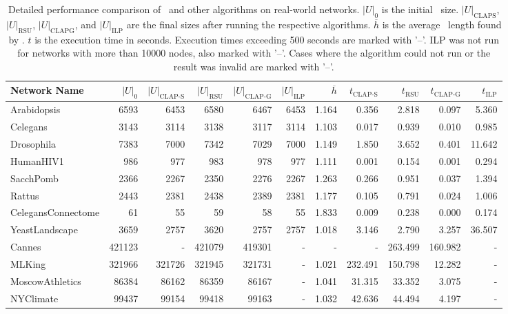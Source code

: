 \begin{table*}[!htbp]
\caption{
    Detailed performance comparison of \algoCLAPS\ and other algorithms on real-world networks. 
    $|U|_0$ is the initial \UDSabbr\ size. 
    $|U|_{\text{CLAPS}}$, $|U|_{\text{RSU}}$, $|U|_{\text{CLAPG}}$, and $|U|_{\text{ILP}}$ are the final sizes after running the respective algorithms. 
    $\overline{h}$ is the average \CLAPabbr\ length found by \algoCLAPS.
    $t$ is the execution time in seconds. 
    Execution times exceeding 500 seconds are marked with '--'. 
    ILP was not run for networks with more than 10000 nodes, also marked with '--'.
    Cases where the algorithm could not run or the result was invalid are marked with '--'.
}
\label{tab:real_networks_comparison}
\centering
\begin{tabular}{lrrrrrrrrrr}
\toprule
Network Name & $|U|_0$ & $|U|_{\text{CLAP-S}}$ & $|U|_{\text{RSU}}$ & $|U|_{\text{CLAP-G}}$ & $|U|_{\text{ILP}}$ & $\overline{h}$ & $t_{\text{CLAP-S}}$ & $t_{\text{RSU}}$ & $t_{\text{CLAP-G}}$ & $t_{\text{ILP}}$ \\
\midrule
Arabidopsis & 6593 & 6453 & 6580 & 6467 & 6453 & 1.164 & 0.356 & 2.818 & 0.097 & 5.360 \\
Celegans & 3143 & 3114 & 3138 & 3117 & 3114 & 1.103 & 0.017 & 0.939 & 0.010 & 0.985 \\
Drosophila & 7383 & 7000 & 7342 & 7029 & 7000 & 1.149 & 1.850 & 3.652 & 0.401 & 11.642 \\
HumanHIV1 & 986 & 977 & 983 & 978 & 977 & 1.111 & 0.001 & 0.154 & 0.001 & 0.294 \\
SacchPomb & 2366 & 2267 & 2350 & 2276 & 2267 & 1.263 & 0.266 & 0.951 & 0.037 & 1.394 \\
Rattus & 2443 & 2381 & 2438 & 2389 & 2381 & 1.177 & 0.105 & 0.791 & 0.024 & 1.006 \\
CelegansConnectome & 61 & 55 & 59 & 58 & 55 & 1.833 & 0.009 & 0.238 & 0.000 & 0.174 \\
YeastLandscape & 3659 & 2757 & 3620 & 2757 & 2757 & 1.018 & 3.146 & 2.790 & 3.257 & 36.507 \\
Cannes & 421123 & - & 421079 & 419301 & - & - & - & 263.499 & 160.982 & - \\
MLKing & 321966 & 321726 & 321945 & 321731 & - & 1.021 & 232.491 & 150.798 & 12.282 & - \\
MoscowAthletics & 86384 & 86162 & 86359 & 86167 & - & 1.041 & 31.315 & 33.352 & 3.075 & - \\
NYClimate & 99437 & 99154 & 99418 & 99163 & - & 1.032 & 42.636 & 44.494 & 4.197 & - \\

\end{tabular}
\end{table*}
